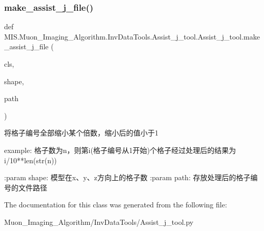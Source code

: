\subsubsection{\texorpdfstring{make\+\_\+assist\+\_\+j\+\_\+file()}{make\_assist\_j\_file()}}
{\footnotesize\ttfamily def M\+I\+S.\+Muon\+\_\+\+Imaging\+\_\+\+Algorithm.\+Inv\+Data\+Tools.\+Assist\+\_\+j\+\_\+tool.\+Assist\+\_\+j\+\_\+tool.\+make\+\_\+assist\+\_\+j\+\_\+file (\begin{DoxyParamCaption}\item[{}]{cls,  }\item[{}]{shape,  }\item[{}]{path }\end{DoxyParamCaption})}

\begin{DoxyVerb}将格子编号全部缩小某个倍数，缩小后的值小于1

example: 格子数为n，则第i(格子编号从1开始)个格子经过处理后的结果为i/10**len(str(n))

:param shape: 模型在x、y、z方向上的格子数
:param path: 存放处理后的格子编号的文件路径
\end{DoxyVerb}
 

The documentation for this class was generated from the following file\+:\begin{DoxyCompactItemize}
\item 
Muon\+\_\+\+Imaging\+\_\+\+Algorithm/\+Inv\+Data\+Tools/Assist\+\_\+j\+\_\+tool.\+py\end{DoxyCompactItemize}
